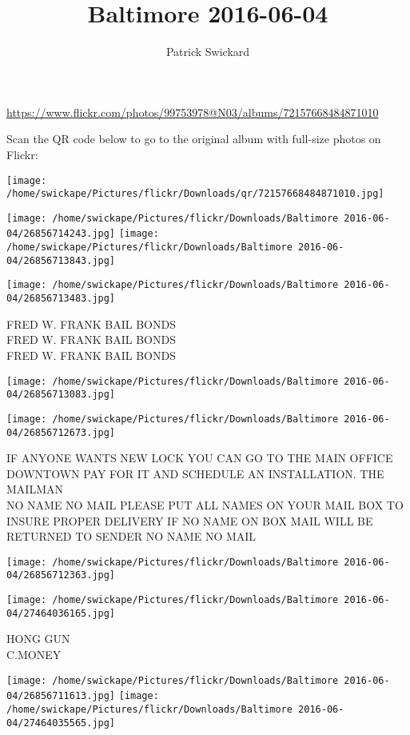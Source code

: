 \documentclass[10pt,letterpaper]{article}
\title{Baltimore 2016-06-04}
\author{Patrick Swickard}
\date{}
\begin{document}
\maketitle

\url{https://www.flickr.com/photos/99753978@N03/albums/72157668484871010}

Scan the QR code below to go to the original album with full-size photos on Flickr:

\texttt{[image: /home/swickape/Pictures/flickr/Downloads/qr/72157668484871010.jpg]}
\pagebreak

\texttt{[image: /home/swickape/Pictures/flickr/Downloads/Baltimore 2016-06-04/26856714243.jpg]}
\texttt{[image: /home/swickape/Pictures/flickr/Downloads/Baltimore 2016-06-04/26856713843.jpg]}

\texttt{[image: /home/swickape/Pictures/flickr/Downloads/Baltimore 2016-06-04/26856713483.jpg]}

FRED W. FRANK BAIL BONDS\\
FRED W. FRANK BAIL BONDS\\
FRED W. FRANK BAIL BONDS
\pagebreak

\texttt{[image: /home/swickape/Pictures/flickr/Downloads/Baltimore 2016-06-04/26856713083.jpg]}

\vspace{0.25in}
\texttt{[image: /home/swickape/Pictures/flickr/Downloads/Baltimore 2016-06-04/26856712673.jpg]}

IF ANYONE WANTS NEW LOCK YOU CAN GO TO THE MAIN OFFICE DOWNTOWN PAY FOR IT AND SCHEDULE AN INSTALLATION. THE MAILMAN\\
NO NAME NO MAIL PLEASE PUT ALL NAMES ON YOUR MAIL BOX TO INSURE PROPER DELIVERY IF NO NAME ON BOX MAIL WILL BE RETURNED TO SENDER NO NAME NO MAIL
\pagebreak

\texttt{[image: /home/swickape/Pictures/flickr/Downloads/Baltimore 2016-06-04/26856712363.jpg]}

\vspace{0.25in}
\texttt{[image: /home/swickape/Pictures/flickr/Downloads/Baltimore 2016-06-04/27464036165.jpg]}

HONG GUN\\
C.MONEY
\pagebreak

\texttt{[image: /home/swickape/Pictures/flickr/Downloads/Baltimore 2016-06-04/26856711613.jpg]}
\texttt{[image: /home/swickape/Pictures/flickr/Downloads/Baltimore 2016-06-04/27464035565.jpg]}
\end{document}
